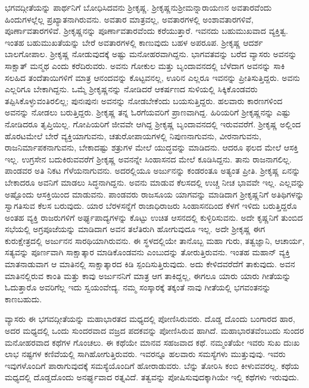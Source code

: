 ಭಗವದ್ಗೀತೆಯನ್ನು ಪಾರ್ಥನಿಗೆ ಬೋಧಿಸಿದವನು ಶ‍್ರೀಕೃಷ್ಣ. ಶ‍್ರೀಕೃಷ್ಣನು\break ಶ‍್ರೀಮನ್ನಾರಾಯಣನ ಅವತಾರವೆಂದು ಹಿಂದುಗಳಲ್ಲೆಲ್ಲ ಪ್ರಖ್ಯಾತನಾಗಿರುವನು. ಅವತಾರ ಮಾತ್ರವಲ್ಲ, ಅವತಾರಗಳಲ್ಲಿ ಅಂಶಾವತಾರಗಳಿವೆ, ಪೂರ್ಣಾವತಾರಗಳಿವೆ. ಶ‍್ರೀಕೃಷ್ಣನನ್ನು ಪೂರ್ಣಾವತಾರವೆಂದು ಕರೆಯುತ್ತಾರೆ. ಇವನದು ಬಹುಮುಖವಾದ ವ್ಯಕ್ತಿತ್ವ. ಇಂತಹ ಬಹು\-ಮುಖತೆ\-ಯನ್ನು ಬೇರೆ ಅವತಾರಗಳಲ್ಲಿ ಕಾಣುವುದು ಬಹಳ ಅಪರೂಪ. ಶ‍್ರೀಕೃಷ್ಣ ಆದರ್ಶ ಬಾಲಗೋಪಾಲ. ಶ‍್ರೀಕೃಷ್ಣ ನೋಡುವುದಕ್ಕೆ ಅಷ್ಟು ಮನೋಹರವಾಗಿದ್ದನು. ಭಾಗವತವನ್ನು ಬರೆದ ವ್ಯಾಸರು ಅವನನ್ನು ಸಾಕ್ಷಾತ್ ಮನ್ಮಥ ಎಂದು ಕರೆದಿರುವರು. ಅವನು ಗೋಕುಲ ಮತ್ತು ಬೃಂದಾವನದಲ್ಲಿ ಬೆಳೆದಾಗ ಅವನನ್ನು ಸಾಕಿ ಸಲಹಿದ ತಂದೆತಾಯಿಗಳಿಗೆ ಮಾತ್ರ ಆನಂದವನ್ನು ಕೊಟ್ಟವನಲ್ಲ, ಊರಿನ ಎಲ್ಲರೂ ಇವನನ್ನು ಪ್ರೀತಿಸುತ್ತಿದ್ದರು. ಅವನು ಎಲ್ಲರಿಗೂ ಬೇಕಾಗಿದ್ದನು. ಒಮ್ಮೆ ಶ‍್ರೀಕೃಷ್ಣನನ್ನು ನೋಡಿದರೆ ಆಕರ್ಷಣದ ಸುಳಿಯಲ್ಲಿ ಸಿಕ್ಕಿಕೊಂಡವರು ತಪ್ಪಿಸಿಕೊಳ್ಳುವಂತಿರಲಿಲ್ಲ; ಪುನಃಪುನಃ ಅವನನ್ನು ನೋಡಬೇಕೆಂದು ಬಯಸುತ್ತಿದ್ದರು. ಹಲವಾರು ಕಾರಣಗಳಿಂದ ಅವನನ್ನು ನೋಡಲು ಬರುತ್ತಿದ್ದರು. ಶ‍್ರೀಕೃಷ್ಣ ತನ್ನ ಓರಗೆಯವರಿಗೆ ಪ್ರಾಣವಾಗಿದ್ದ. ಹಿರಿಯರಿಗೆ ಶ‍್ರೀಕೃಷ್ಣನನ್ನು ಎಷ್ಟು ನೋಡಿದರೂ ತೃಪ್ತಿಯಿಲ್ಲ. ಗೋಪಿಯರಿಗೆ ಜೀವವೇ ಆಗಿದ್ದ ಶ‍್ರೀಕೃಷ್ಣ ಬೃಂದಾವನದಲ್ಲಿ ಇರುವವರೆಗೆ. ಶ‍್ರೀಕೃಷ್ಣ ಅಲ್ಲಿಂದ ಹೊರಟಮೇಲೆ ಬೇರೆ ವ್ಯಕ್ತಿಯಾಗುವನು, ಚತುರೋಪಾಯಗಳಲ್ಲಿ ನಿಪುಣನಾಗುವನು, ವೀರನಾಗುವನು, ರಾಜ\-ನಿರ್ಮಾಪಕನಾಗುವನು, ಬೇಕಾದಷ್ಟು ಶತ್ರುಗಳ ಮೇಲೆ ಯುದ್ಧವನ್ನು ಮಾಡಿದನು. ಆದರೂ ಫಲದ ಮೇಲೆ ಆಸಕ್ತಿ ಇಲ್ಲ. ಉಗ್ರಸೇನ ಬದುಕಿರುವವರೆಗೆ ಶ‍್ರೀಕೃಷ್ಣ ಅವನನ್ನೇ ಸಿಂಹಾಸನದ ಮೇಲೆ ಕೂಡಿಸಿದ್ದನು. ತಾನು ರಾಜನಾಗಲಿಲ್ಲ. ಪಾಂಡವರ ಅತಿ ನಿಕಟ ಗೆಳೆಯನಾಗುವನು. ಅದರಲ್ಲಿಯೂ ಅರ್ಜುನನ್ನು ಕಂಡರಂತೂ ಅತ್ಯಂತ ಪ್ರೀತಿ. ಶ‍್ರೀಕೃಷ್ಣ ಏನನ್ನು ಬೇಕಾದರೂ ಅವನಿಗೆ ಮಾಡಲು ಸಿದ್ಧನಾಗಿದ್ದನು. ಅವನು ಮಾಡುವ ಕೆಲಸದಲ್ಲಿ ಉಚ್ಚ ನೀಚ ಭಾವವೇ ಇಲ್ಲ. ಎಲ್ಲವನ್ನು ಅಷ್ಟೊಂದು ಆಸಕ್ತಿಯಿಂದ ಮಾಡುವನು. ಪಾಂಡವರು ರಾಜಸೂಯ ಯಾಗವನ್ನು ಮಾಡಿದಾಗ ಶ‍್ರೀಕೃಷ್ಣನಿಗೆ ಅತಿಥಿಗಳನ್ನು ಸ್ವಾಗತಿಸುವ ಕೆಲಸ ಬರುವುದು. ಯಾರ ಬೆರಳಸನ್ನೆಗೆ ರಾಜಾಧಿರಾಜರು ಸಿಂಹಾಸನದಿಂದ ಕೆಳಗೆ ಇಳಿದು ಬರುತ್ತಿದ್ದರೊ ಅಂತಹ ವ್ಯಕ್ತಿ ರಾಜರುಗಳಿಗೆ ಅರ್ಘ್ಯಪಾದ್ಯಗಳನ್ನು ಕೊಟ್ಟು ಉಚಿತ ಆಸನದಲ್ಲಿ ಕುಳ್ಳಿರಿಸುವನು. ಅದೇ ಕೃಷ್ಣನಿಗೆ ತುಂಬಿದ ಸಭೆಯಲ್ಲಿ ಅಗ್ರಪೂಜೆಯನ್ನು ಮಾಡಿದಾಗ ಅವನ ತಲೆತಿರುಗಿ ಹೋಗುವುದೂ ಇಲ್ಲ. ಅದೇ ಶ‍್ರೀಕೃಷ್ಣ ಈಗ ಕುರುಕ್ಷೇತ್ರದಲ್ಲಿ ಅರ್ಜುನನ ಸಾರಥಿಯಾಗಿರುವನು. ಈ ಸ್ಥಳದಲ್ಲಿಯೇ ತಾನೊಬ್ಬ ಮಹಾ ಗುರು, ತತ್ವಜ್ಞಾನಿ, ಆಚಾರ್ಯ, ಸತ್ಯವನ್ನು ಪೂರ್ಣವಾಗಿ ಸಾಕ್ಷಾತ್ಕಾರ ಮಾಡಿಕೊಂಡವನು ಎಂಬುದನ್ನು ತೋರುತ್ತಿರುವನು. ಇಂತಹ ಮಹಾನ್ ವ್ಯಕ್ತಿ ಮಾತನಾಡುವಾಗ ಆ ಮಾತಿನಲ್ಲಿ ಸಾಕ್ಷಾತ್ಕಾರದ ಕಿಡಿ ಸ್ಪಂದಿಸುತ್ತಿರುವುದು. ಅದು ಕೇಳಿದವರೆದೆಗೆ ತಾಕುವುದು. ಅವನ ಮಾತಿನಲ್ಲಿರುವ ಕಾಂತಿ ಮತ್ತು ಕಾವು ಅರ್ಜುನನಿಗೆ ಮಾತ್ರ ಆಗ ತಾಕಿದ್ದಲ್ಲ, ಈಗಲೂ ಯಾರು ಯಾರು ಗೀತೆಯನ್ನು ಓದುತ್ತಾರೊ ಅವರಿಗೆಲ್ಲ ಇದು ಸ್ವಯಂವೇದ್ಯ. ನಮ್ಮ ಸಂಸ್ಕಾರಕ್ಕೆ ತಕ್ಕಂತೆ ನಾವು ಗೀತೆಯಲ್ಲಿ ಭಗವಂತನನ್ನು ಕಾಣಬಹುದು.

ವ್ಯಾಸರು ಈ ಭಗವದ್ಗೀತೆಯನ್ನು ಮಹಾಭಾರತದ ಮಧ್ಯದಲ್ಲಿ ಪೋಣಿಸಿರುವರು. ದೊಡ್ಡ ದೊಂದು ಬಂಗಾರದ ಹಾರ, ಅದರ ಮಧ್ಯದಲ್ಲಿ ಒಂದು ಸುಂದರವಾದ ವಜ್ರದ ಪದಕವನ್ನು ಪೋಣಿಸಿರುವ ಹಾಗಿದೆ. ಮಹಾಭಾರತವೆಂಬುದು ಸುಂದರ ಮನೋಹರವಾದ ಕಥೆಗಳ ಗೊಂಚಲು. ಈ ಕಥೆಯೇ ಮಾನವ ಸಹಜವಾದ ಕಥೆ. ನಮ್ಮಂತೆಯೇ ಇವರು ಸುಖ ದುಃಖ ಲಾಭ ನಷ್ಟಗಳ ಕಣಿವೆಯಲ್ಲಿ ಸಾಗಿಹೋಗುತ್ತಿರುವರು. ಇವರನ್ನೂ ಹಲವಾರು ಸಮಸ್ಯೆಗಳು ಮುತ್ತುವುವು. ಇವರು ಇವುಗಳೊಂದಿಗೆ ಪಾರಾಗುವುದಕ್ಕೆ ಸಮಸ್ಯೆಯೊಂದಿಗೆ ಹೋರಾಡುವರು. ಬೆನ್ನು ತೋರಿಸಿ ಕಂಬಿ ಕೀಳುವವರಲ್ಲ. ಕಥೆಯ ಮಧ್ಯದಲ್ಲಿ ದೊಡ್ಡದೊಂದು ಅನರ್ಘ್ಯವಾದ ರತ್ನವಿದೆ. ತತ್ವವನ್ನು ಪೋಷಿಸುವುದಕ್ಕಾಗಿಯೇ ಇಲ್ಲಿ ಕಥೆಗಳು ಇರುವುದು.

